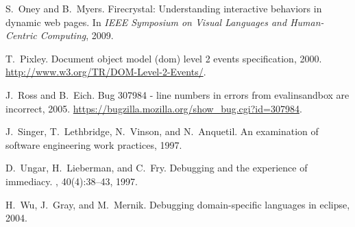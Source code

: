 \documentclass{www2010-accepted}
\begin{document}
\begin{thebibliography}{10}
S.~Oney and B.~Myers.
\newblock Firecrystal: Understanding interactive behaviors in dynamic web
  pages.
\newblock In {\em IEEE Symposium on Visual Languages and Human-Centric
  Computing}, 2009.

T.~Pixley.
\newblock Document object model (dom) level 2 events specification, 2000.
\newblock \url{http://www.w3.org/TR/DOM-Level-2-Events/}.

J.~Ross and B.~Eich.
\newblock Bug 307984 - line numbers in errors from evalinsandbox are incorrect,
  2005.
\newblock \url{https://bugzilla.mozilla.org/show_bug.cgi?id=307984}.

J.~Singer, T.~Lethbridge, N.~Vinson, and N.~Anquetil.
\newblock An examination of software engineering work practices, 1997.

D.~Ungar, H.~Lieberman, and C.~Fry.
\newblock Debugging and the experience of immediacy.
, 40(4):38--43, 1997.

H.~Wu, J.~Gray, and M.~Mernik.
\newblock Debugging domain-specific languages in eclipse, 2004.

\end{thebibliography}
\end{document}
